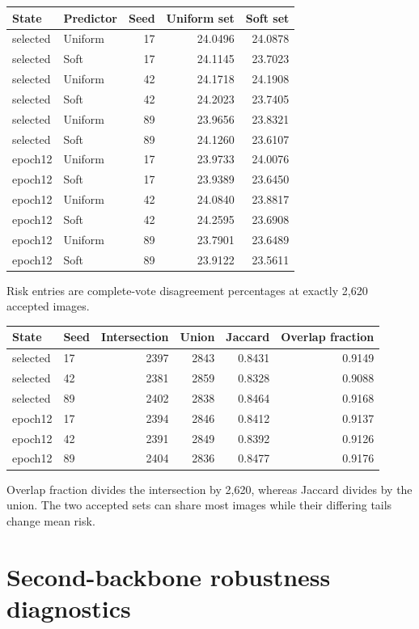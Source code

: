 \documentclass[10pt]{article}
\begin{document}
\begin{longtable}{llrrr}\toprule State & Predictor & Seed & Uniform set & Soft set\\\midrule\endhead
selected & Uniform & 17 & 24.0496 & 24.0878\\
selected & Soft & 17 & 24.1145 & 23.7023\\
selected & Uniform & 42 & 24.1718 & 24.1908\\
selected & Soft & 42 & 24.2023 & 23.7405\\
selected & Uniform & 89 & 23.9656 & 23.8321\\
selected & Soft & 89 & 24.1260 & 23.6107\\
epoch12 & Uniform & 17 & 23.9733 & 24.0076\\
epoch12 & Soft & 17 & 23.9389 & 23.6450\\
epoch12 & Uniform & 42 & 24.0840 & 23.8817\\
epoch12 & Soft & 42 & 24.2595 & 23.6908\\
epoch12 & Uniform & 89 & 23.7901 & 23.6489\\
epoch12 & Soft & 89 & 23.9122 & 23.5611\\
\bottomrule\end{longtable}
Risk entries are complete-vote disagreement percentages at exactly 2,620 accepted images.
\begin{longtable}{llrrrr}\toprule State & Seed & Intersection & Union & Jaccard & Overlap fraction\\\midrule\endhead
selected & 17 & 2397 & 2843 & 0.8431 & 0.9149\\
selected & 42 & 2381 & 2859 & 0.8328 & 0.9088\\
selected & 89 & 2402 & 2838 & 0.8464 & 0.9168\\
epoch12 & 17 & 2394 & 2846 & 0.8412 & 0.9137\\
epoch12 & 42 & 2391 & 2849 & 0.8392 & 0.9126\\
epoch12 & 89 & 2404 & 2836 & 0.8477 & 0.9176\\
\bottomrule\end{longtable}
Overlap fraction divides the intersection by 2,620, whereas Jaccard divides by the union. The two accepted sets can share most images while their differing tails change mean risk.
\clearpage\section*{Second-backbone robustness diagnostics}


\end{document}
